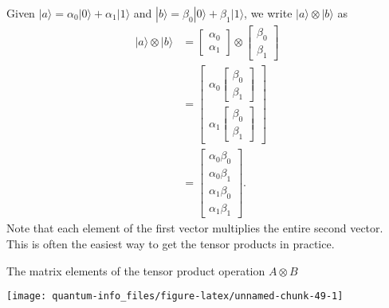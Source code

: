 \documentclass[fleqn]{article}
\begin{document}
Given \(|a\rangle = \alpha_0|0\rangle + \alpha_1|1\rangle\) and \(|b\rangle = \beta_0|0\rangle +\beta_1|1\rangle\), we write \(|a\rangle\otimes|b\rangle\) as
\[
  \begin{aligned}
    |a\rangle\otimes|b\rangle
    &= \begin{bmatrix}\alpha_0\\\alpha_1\end{bmatrix} \otimes \begin{bmatrix}\beta_0\\\beta_1\end{bmatrix}
  \\&= \begin{bmatrix}\alpha_0\begin{bmatrix}\beta_0\\\beta_1\end{bmatrix}\\\alpha_1\begin{bmatrix}\beta_0\\\beta_1\end{bmatrix}\end{bmatrix}
  \\&= \begin{bmatrix}\alpha_0\beta_0\\\alpha_0\beta_1\\\alpha_1\beta_0\\\alpha_1\beta_1\end{bmatrix}.
  \end{aligned}
\]
Note that each element of the first vector multiplies the entire second vector.
This is often the easiest way to get the tensor products in practice.

The matrix elements of the tensor product operation \(A\otimes B\)

\begin{center}\texttt{[image: quantum-info\_files/figure-latex/unnamed-chunk-49-1]} \end{center}
\end{document}
